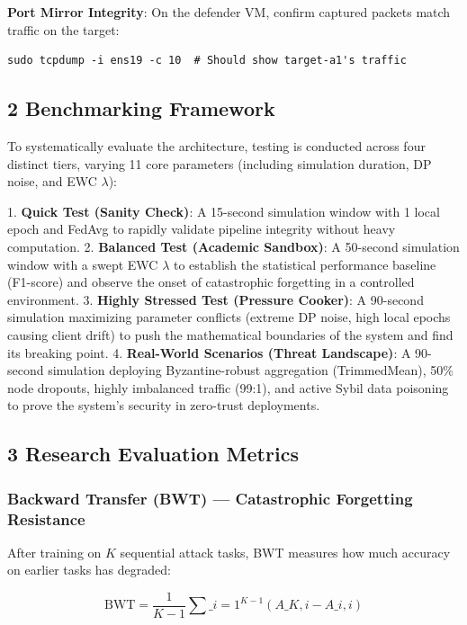 \documentclass[conference]{IEEEtran}
\begin{document}
\textbf{Port Mirror Integrity}: On the defender VM, confirm captured packets match traffic on the target:

\begin{verbatim}
sudo tcpdump -i ens19 -c 10  # Should show target-a1's traffic
\end{verbatim}


\subsection{2 Benchmarking Framework}

To systematically evaluate the architecture, testing is conducted across four distinct tiers, varying 11 core parameters (including simulation duration, DP noise, and EWC $\lambda$):

1. \textbf{Quick Test (Sanity Check)}: A 15-second simulation window with 1 local epoch and FedAvg to rapidly validate pipeline integrity without heavy computation.
2. \textbf{Balanced Test (Academic Sandbox)}: A 50-second simulation window with a swept EWC $\lambda$ to establish the statistical performance baseline (F1-score) and observe the onset of catastrophic forgetting in a controlled environment.
3. \textbf{Highly Stressed Test (Pressure Cooker)}: A 90-second simulation maximizing parameter conflicts (extreme DP noise, high local epochs causing client drift) to push the mathematical boundaries of the system and find its breaking point.
4. \textbf{Real-World Scenarios (Threat Landscape)}: A 90-second simulation deploying Byzantine-robust aggregation (TrimmedMean), 50\% node dropouts, highly imbalanced traffic (99:1), and active Sybil data poisoning to prove the system's security in zero-trust deployments.


\subsection{3 Research Evaluation Metrics}



\subsubsection{Backward Transfer (BWT) — Catastrophic Forgetting Resistance}

After training on $K$ sequential attack tasks, BWT measures how much accuracy on earlier tasks has degraded:

$$\text{BWT} = \frac{1}{K-1} \sum\_{i=1}^{K-1} (A\_{K,i} - A\_{i,i})$$
\end{document}
